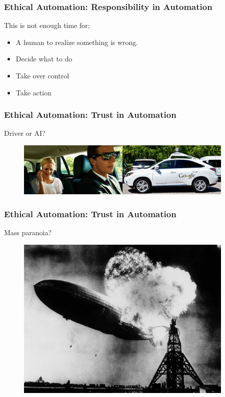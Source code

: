 \begin{frame}
	\frametitle{ Ethical Automation: Responsibility in Automation}
	{\Large This is not enough time for;}
	\begin{itemize}
		\item A human to realize something is wrong.
		\item Decide what to do
		\item Take over control
		\item Take action
	\end{itemize}
\end{frame}

\begin{frame}
	\frametitle{ Ethical Automation: Trust in Automation}
	{\Large Driver or AI?}
	\begin{figure}[bht]
		\centering
		\includegraphics[width=4.1in]{diagrams/car}
		\caption{}
		\label{fig:-deg}
	\end{figure}
\end{frame}

\begin{frame}
	\frametitle{ Ethical Automation: Trust in Automation}
	{\Large Mass paranoia?}
	\begin{figure}[bht]
		\centering
		\includegraphics[width=4.1in]{diagrams/Hindenburg}
		\caption{}
		\label{fig:-deg}
	\end{figure}
\end{frame}

